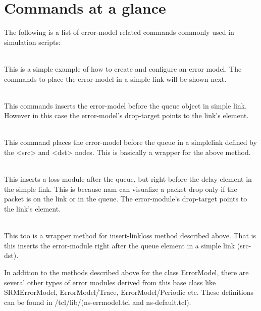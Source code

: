 \section{Commands at a glance}
\label{sec:errmodelcommand}

The following is a list of error-model related commands commonly used in
simulation scripts:
\begin{flushleft}
\\
This is a simple example of how to create and configure an error model.
The commands to place the error-model in a simple link will be shown next.


\\
This commands inserts the error-model before the queue object in simple link.
However in this case the error-model's drop-target points to the link's
 element.


\\
This command places the error-model before the queue in a simplelink defined
by the <src> and <dst> nodes. This is basically a wrapper for the above method.


\\
This inserts a loss-module after the queue, but right before the delay 
element in the simple link. This is because nam can visualize a packet drop
only if the packet is on the link or in the queue. The error-module's
drop-target points to the link's  element.


\\
This too is a wrapper method for insert-linkloss method described above.
That is this inserts the error-module right after the queue element in a
simple link (src-dst).

In addition to the methods described above for the class ErrorModel, there
are several other types of error modules derived from this base class like
SRMErrorModel, ErrorModel/Trace, ErrorModel/Periodic etc. These definitions
can be found in \ns/tcl/lib/(ns-errmodel.tcl and ns-default.tcl).

\end{flushleft}


